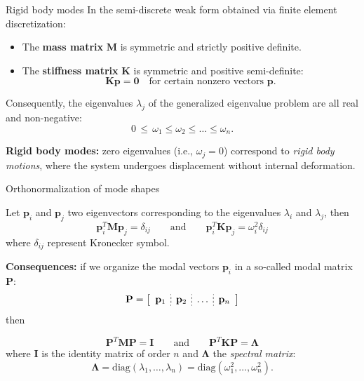 \documentclass[aspectratio=169]{beamer}
\begin{document}
{  \begin{frame}{Rigid body modes}
    In the semi-discrete weak form obtained via finite element discretization:
    \begin{itemize}
      \item The \textbf{mass matrix} \( \mathbf{M} \) is symmetric and strictly positive definite.
      \item The \textbf{stiffness matrix} \( \mathbf{K} \) is symmetric and positive semi-definite:
            \[
              \mathbf{K} \mathbf{p} = \mathbf{0} \quad \text{for certain nonzero vectors } \mathbf{p}.
            \]
    \end{itemize}
    Consequently, the eigenvalues \( \lambda_j\) of the generalized eigenvalue problem are all real and non-negative:
    \[
      0 \,\leq\, \omega_1 \leq \omega_2 \leq \dots \leq \omega_n.
    \]

    \begin{block}{}
      \textbf{Rigid body modes:} zero eigenvalues (i.e., \( \omega_j = 0 \)) correspond to \emph{rigid body motions}, where the system undergoes displacement without internal deformation.
    \end{block}
  \end{frame}

  \begin{frame}{Orthonormalization of mode shapes}
    \begin{block}{}
      Let $\mathbf p_i$ and $\mathbf p_j$ two eigenvectors corresponding to the  eigenvalues $\lambda_i$ and $\lambda_j$, then
      $$
        \mathbf p_i^T\mathbf M\mathbf p_j  =\delta_{ij}
        \qquad\text{and}\qquad
        \mathbf p_i^T\mathbf K\mathbf p_j  =\omega_i^2\delta_{ij}
      $$
      where $\delta_{ij}$ represent Kronecker symbol.
    \end{block}
    \textbf{Consequences:} if we organize the modal vectors $\mathbf p_i$ in a so-called modal matrix $\mathbf P$:
    $$\mathbf P=\left[ \begin{array}{c;{2pt/2pt}c;{2pt/2pt}c;{2pt/2pt}c}
          \mathbf p_{1} & \mathbf p_{2} & \dots & \mathbf p_{n} \\
        \end{array}\right]$$
    then
    \begin{block}{}
      $$  \mathbf P^T\mathbf M\mathbf P  =\mathbf I       \qquad\text{and}\qquad
        \mathbf P^T\mathbf K\mathbf P  =\mathbf\Lambda$$
      where $\mathbf I$ is the identity matrix of order $n$ and $\mathbf\Lambda$ the \emph{spectral matrix}:
      $$\mathbf\Lambda=\text{diag}(\lambda_1,\dots,\lambda_n)=\text{diag}(\omega_1^2,\dots,\omega_n^2).$$
    \end{block}
  \end{frame}
 }
\end{document}
